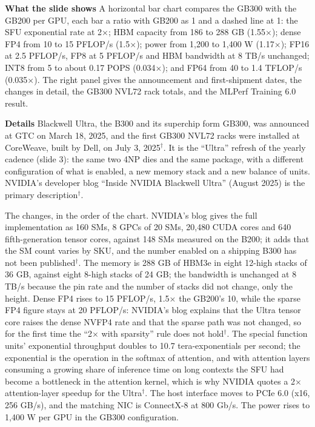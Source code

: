 \documentclass[11pt,letterpaper]{article}
\newcommand{\para}[1]{\medskip\noindent\textbf{#1}\quad}
\begin{document}
\para{What the slide shows} A horizontal bar chart compares the GB300 with the GB200 per GPU, each bar a ratio with GB200 as 1 and a dashed line at 1: the SFU exponential rate at 2$\times$; HBM capacity from 186 to 288 GB (1.55$\times$); dense FP4 from 10 to 15 PFLOP/s (1.5$\times$); power from 1{,}200 to 1{,}400 W (1.17$\times$); FP16 at 2.5 PFLOP/s, FP8 at 5 PFLOP/s and HBM bandwidth at 8 TB/s unchanged; INT8 from 5 to about 0.17 POPS (0.034$\times$); and FP64 from 40 to 1.4 TFLOP/s (0.035$\times$). The right panel gives the announcement and first-shipment dates, the changes in detail, the GB300 NVL72 rack totals, and the MLPerf Training 6.0 result.

\para{Details} Blackwell Ultra, the B300 and its superchip form GB300, was announced at GTC on March 18, 2025, and the first GB300 NVL72 racks were installed at CoreWeave, built by Dell, on July 3, 2025$^\dagger$. It is the ``Ultra'' refresh of the yearly cadence (slide 3): the same two 4NP dies and the same package, with a different configuration of what is enabled, a new memory stack and a new balance of units. NVIDIA's developer blog ``Inside NVIDIA Blackwell Ultra'' (August 2025) is the primary description$^\dagger$.

The changes, in the order of the chart. NVIDIA's blog gives the full implementation as 160 SMs, 8 GPCs of 20 SMs, 20{,}480 CUDA cores and 640 fifth-generation tensor cores, against 148 SMs measured on the B200; it adds that the SM count varies by SKU, and the number enabled on a shipping B300 has not been published$^\dagger$. The memory is 288 GB of HBM3e in eight 12-high stacks of 36 GB, against eight 8-high stacks of 24 GB; the bandwidth is unchanged at 8 TB/s because the pin rate and the number of stacks did not change, only the height. Dense FP4 rises to 15 PFLOP/s, 1.5$\times$ the GB200's 10, while the sparse FP4 figure stays at 20 PFLOP/s: NVIDIA's blog explains that the Ultra tensor core raises the dense NVFP4 rate and that the sparse path was not changed, so for the first time the ``2$\times$ with sparsity'' rule does not hold$^\dagger$. The special function units' exponential throughput doubles to 10.7 tera-exponentials per second; the exponential is the operation in the softmax of attention, and with attention layers consuming a growing share of inference time on long contexts the SFU had become a bottleneck in the attention kernel, which is why NVIDIA quotes a 2$\times$ attention-layer speedup for the Ultra$^\dagger$. The host interface moves to PCIe 6.0 (x16, 256 GB/s), and the matching NIC is ConnectX-8 at 800 Gb/s. The power rises to 1{,}400 W per GPU in the GB300 configuration.
\end{document}
